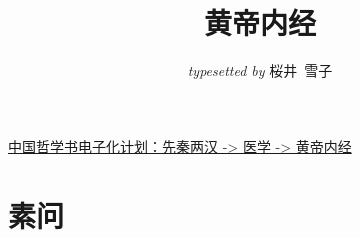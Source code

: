 \documentclass{ctexart}
\title{黄帝内经}
\author{\textit{typesetted by} 桜井\ 雪子}
\date{}
\begin{document}
\maketitle
\tableofcontents

\href{https://ctext.org/huangdi-neijing/}{中国哲学书电子化计划：先秦两汉 -> 医学 -> 黄帝内经}

\section{素问}




\end{document}
